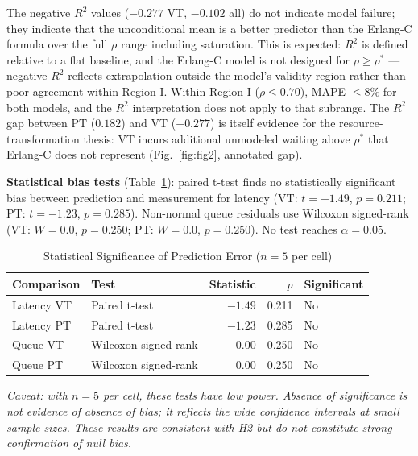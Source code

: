 \documentclass[10pt]{article}
\newenvironment{caveat}{\small\itshape}{\par}
\begin{document}
The negative $R^2$ values ($-0.277$ VT, $-0.102$ all) do not indicate model failure; they indicate that the unconditional mean is a better predictor than the Erlang-C formula over the full $\rho$ range including saturation. This is expected: $R^2$ is defined relative to a flat baseline, and the Erlang-C model is not designed for $\rho \geq \rho^*$ --- negative $R^2$ reflects extrapolation outside the model's validity region rather than poor agreement within Region I. Within Region I ($\rho \leq 0.70$), MAPE $\leq 8\%$ for both models, and the $R^2$ interpretation does not apply to that subrange. The $R^2$ gap between PT ($0.182$) and VT ($-0.277$) is itself evidence for the resource-transformation thesis: VT incurs additional unmodeled waiting above $\rho^*$ that Erlang-C does not represent (Fig.~\ref{fig:fig2}, annotated gap).

\textbf{Statistical bias tests} (Table~\ref{tab:sigtests}): paired t-test finds no statistically significant bias between prediction and measurement for latency (VT: $t = -1.49$, $p = 0.211$; PT: $t = -1.23$, $p = 0.285$). Non-normal queue residuals use Wilcoxon signed-rank (VT: $W = 0.0$, $p = 0.250$; PT: $W = 0.0$, $p = 0.250$). No test reaches $\alpha = 0.05$.

\begin{table}[t]
\centering
\caption{Statistical Significance of Prediction Error ($n=5$ per cell)}
\label{tab:sigtests}
\begin{tabular}{@{}llrrl@{}}
\toprule
\textbf{Comparison} & \textbf{Test} & \textbf{Statistic} & \textbf{$p$} & \textbf{Significant} \\
\midrule
Latency VT & Paired t-test           & $-1.49$ & 0.211 & No \\
Latency PT & Paired t-test           & $-1.23$ & 0.285 & No \\
Queue VT   & Wilcoxon signed-rank    & 0.00    & 0.250 & No \\
Queue PT   & Wilcoxon signed-rank    & 0.00    & 0.250 & No \\
\bottomrule
\end{tabular}
\end{table}

\begin{caveat}
Caveat: with $n=5$ per cell, these tests have low power. Absence of significance is not evidence of absence of bias; it reflects the wide confidence intervals at small sample sizes. These results are consistent with H2 but do not constitute strong confirmation of null bias.
\end{caveat}
\end{document}
